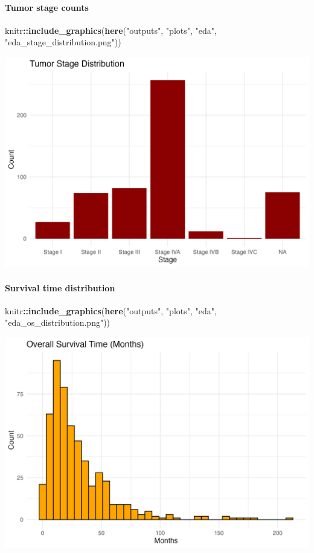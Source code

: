 \documentclass[
  11pt,
]{article}
\newenvironment{Shaded}{\begin{snugshade}}{\end{snugshade}}
\newcommand{\FunctionTok}[1]{\textcolor[rgb]{0.13,0.29,0.53}{\textbf{#1}}}
\newcommand{\NormalTok}[1]{#1}
\newcommand{\SpecialCharTok}[1]{\textcolor[rgb]{0.81,0.36,0.00}{\textbf{#1}}}
\newcommand{\StringTok}[1]{\textcolor[rgb]{0.31,0.60,0.02}{#1}}
\begin{document}
\paragraph{Tumor stage counts}\label{tumor-stage-counts}

\begin{Shaded}
\begin{Highlighting}[]
\NormalTok{knitr}\SpecialCharTok{::}\FunctionTok{include\_graphics}\NormalTok{(}\FunctionTok{here}\NormalTok{(}\StringTok{"outputs"}\NormalTok{, }\StringTok{"plots"}\NormalTok{, }\StringTok{"eda"}\NormalTok{, }\StringTok{"eda\_stage\_distribution.png"}\NormalTok{))}
\end{Highlighting}
\end{Shaded}

\includegraphics[width=0.8\linewidth]{../outputs/plots/eda/eda_stage_distribution}

\paragraph{Survival time distribution}\label{survival-time-distribution}

\begin{Shaded}
\begin{Highlighting}[]
\NormalTok{knitr}\SpecialCharTok{::}\FunctionTok{include\_graphics}\NormalTok{(}\FunctionTok{here}\NormalTok{(}\StringTok{"outputs"}\NormalTok{, }\StringTok{"plots"}\NormalTok{, }\StringTok{"eda"}\NormalTok{, }\StringTok{"eda\_os\_distribution.png"}\NormalTok{))}
\end{Highlighting}
\end{Shaded}

\includegraphics[width=0.8\linewidth]{../outputs/plots/eda/eda_os_distribution}
\end{document}
